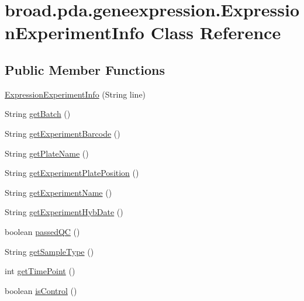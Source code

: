 \hypertarget{classbroad_1_1pda_1_1geneexpression_1_1_expression_experiment_info}{\section{broad.\+pda.\+geneexpression.\+Expression\+Experiment\+Info Class Reference}
\label{classbroad_1_1pda_1_1geneexpression_1_1_expression_experiment_info}
}
\subsection*{Public Member Functions}
\begin{DoxyCompactItemize}
\item 
\hyperlink{classbroad_1_1pda_1_1geneexpression_1_1_expression_experiment_info_aee1df8d9ab59deebc1e228e0e23dc3d2}{Expression\+Experiment\+Info} (String line)
\item 
String \hyperlink{classbroad_1_1pda_1_1geneexpression_1_1_expression_experiment_info_a0976a22c2b4b93d161aebffa64b0d3c6}{get\+Batch} ()
\item 
String \hyperlink{classbroad_1_1pda_1_1geneexpression_1_1_expression_experiment_info_a46a19fd7392e8a56bd709311e8c86d9b}{get\+Experiment\+Barcode} ()
\item 
String \hyperlink{classbroad_1_1pda_1_1geneexpression_1_1_expression_experiment_info_aef3d20dab34dc299f66fe686bb0fa1c1}{get\+Plate\+Name} ()
\item 
String \hyperlink{classbroad_1_1pda_1_1geneexpression_1_1_expression_experiment_info_a6f8e2b5864eee31aee23c61ac20e60e6}{get\+Experiment\+Plate\+Position} ()
\item 
String \hyperlink{classbroad_1_1pda_1_1geneexpression_1_1_expression_experiment_info_a521009d9236367aff6d71cf592e6bd65}{get\+Experiment\+Name} ()
\item 
String \hyperlink{classbroad_1_1pda_1_1geneexpression_1_1_expression_experiment_info_a2ca0ee915a370cf16c1f1ef286bc666d}{get\+Experiment\+Hyb\+Date} ()
\item 
boolean \hyperlink{classbroad_1_1pda_1_1geneexpression_1_1_expression_experiment_info_a99da3d9c6acb754fb23c41c3c189dd55}{passed\+Q\+C} ()
\item 
String \hyperlink{classbroad_1_1pda_1_1geneexpression_1_1_expression_experiment_info_a08698d848b21586d3d5c78cd8f4769e3}{get\+Sample\+Type} ()
\item 
int \hyperlink{classbroad_1_1pda_1_1geneexpression_1_1_expression_experiment_info_a43d0cde2352a1bf06b6b9de5c54c769e}{get\+Time\+Point} ()
\item 
boolean \hyperlink{classbroad_1_1pda_1_1geneexpression_1_1_expression_experiment_info_a4c33bc19d44228905f603c3aa5bcefe8}{is\+Control} ()
\end{DoxyCompactItemize}


